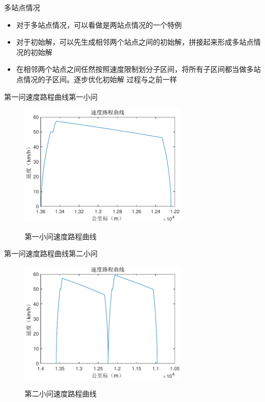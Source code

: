 \documentclass{beamer}
\begin{document}
\begin{frame}{多站点情况}
\begin{itemize}
  \item 对于多站点情况，可以看做是两站点情况的一个特例
  \item 对于初始解，可以先生成相邻两个站点之间的初始解，拼接起来形成多站点情况的初始解
  \item 在相邻两个站点之间任然按照速度限制划分子区间，将所有子区间都当做多站点情况的子区间。逐步优化初始解
  过程与之前一样
\end{itemize}
\end{frame}

\begin{frame}{第一问速度路程曲线}{第一小问}
\begin{figure}
  \centering
  \includegraphics[width=8cm]{fig/fig9/fig9.pdf}\\
  \caption{第一小问速度路程曲线}
\end{figure}

\end{frame}

\begin{frame}{第一问速度路程曲线}{第二小问}
\begin{figure}
  \centering
  \includegraphics[width=8cm]{fig/fig10/fig10.pdf}\\
  \caption{第二小问速度路程曲线}
\end{figure}

\end{frame}
\end{document}

